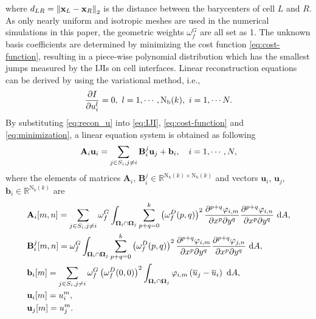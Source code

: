 where $d_{LR}= \left\| \mathbf{x}_L -\mathbf{x}_R \right\|_2$ is the distance between the barycenters of cell $L$ and $R$.
As only nearly uniform and isotropic meshes are used in the numerical simulations in this paper,
the geometric weights
$\omega^G_f$ are all set as 1.
The unknown basis coefficients are determined by minimizing the cost function \eqref{eq:cost-function}, resulting in a  piece-wise polynomial distribution which has the smallest jumps measured by the IJIs on cell interfaces. 
Linear reconstruction equations can be derived by using the variational method, i.e.,
\begin{equation}
	\label{eq:minimization}
    \partialderivative{I}{u_i^l} = 0, \ l=1,\cdots, \mathrm{N_b}(k),\  i=1,\cdots N.
\end{equation}
By substituting \eqref{eq:recon_u} into \eqref{eq:IJI}, \eqref{eq:cost-function} and \eqref{eq:minimization}, a linear equation system is obtained as following
\begin{equation}
    \label{eq:vrBlockEq}
  \mathbf{A}_{i} \mathbf{u}_i
    =
    \sum_{j \in S_i, j \neq i} \mathbf{B}^j_{i} \mathbf{u}_j + \mathbf{b}_{i}, \quad i=1, \cdots, N,
\end{equation}
where the elements of matrices $\mathbf{A}_i$, $\mathbf{B}^j_i \in \mathbb{R}^{\mathrm{N_b}(k) \times \mathrm{N_b}(k)}$ and vectors $\mathbf{u}_i$, $\mathbf{u}_j$, $\mathbf{b}_i \in \mathbb{R}^{\mathrm{N_b}(k)}$ are
\begin{equation}
    \label{eq:vrCoeffs}
    \begin{aligned}
        &\mathbf{A}_{i} [m,n]=
               \sum_{j \in S_i, j \neq i} \omega_f^G\int_{\OO_i \cap \OO_j}{
                    \sum_{p+q=0}^{k}
                    \left(\omega_f^D(p,q)\right)^2
                    \partialderivative{^{p+q}\varphi_{i,m}}{x^p\partial y^q}
                    \partialderivative{^{p+q}\varphi_{i,n}}{x^p\partial y^q}
                    \ \dd A},
           \\
        &\mathbf{B}^j_{i} [m,n]= 
                \omega_f^G\int_{\OO_i \cap \OO_j}{
                    \sum_{p+q=0}^{k}
                    \left(\omega_f^D(p,q)\right)^2
                    \partialderivative{^{p+q}\varphi_{i,m}}{x^p\partial y^q}
                    \partialderivative{^{p+q}\varphi_{j,n}}{x^p\partial y^q}
                    \ \dd A},
           \\
        &\mathbf{b}_{i} [m]=
        			\sum_{j \in S_i, j \neq i} 
                    \omega_f^G \left(\omega_f^D(0,0)\right)^2
                    \int_{\OO_i \cap \OO_j}{
                        \varphi_{i,m} \left(\overline{u}_j - \overline{u}_i\right)
                        \ \dd A},
		 \\
		 & \mathbf{u}_i [m]= u^m_i, \\ 
		 & \mathbf{u}_j [m]= u^m_j.
    \end{aligned}
\end{equation}
